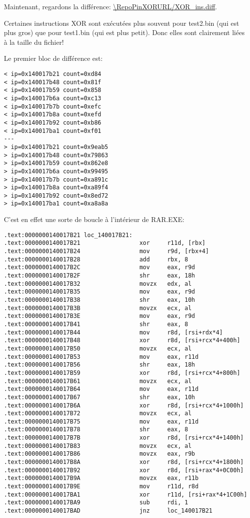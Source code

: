 Maintenant, regardons la différence: \url{\RepoPinXORURL/XOR_ins.diff}.

Certaines instructions XOR sont exécutées plus souvent pour test2.bin (qui est plus
gros) que pour test1.bin (qui est plus petit).
Donc elles sont clairement liées à la taille du fichier!

Le premier bloc de différence est:

\begin{lstlisting}
< ip=0x140017b21 count=0xd84
< ip=0x140017b48 count=0x81f
< ip=0x140017b59 count=0x858
< ip=0x140017b6a count=0xc13
< ip=0x140017b7b count=0xefc
< ip=0x140017b8a count=0xefd
< ip=0x140017b92 count=0xb86
< ip=0x140017ba1 count=0xf01
---
> ip=0x140017b21 count=0x9eab5
> ip=0x140017b48 count=0x79863
> ip=0x140017b59 count=0x862e8
> ip=0x140017b6a count=0x99495
> ip=0x140017b7b count=0xa891c
> ip=0x140017b8a count=0xa89f4
> ip=0x140017b92 count=0x8ed72
> ip=0x140017ba1 count=0xa8a8a
\end{lstlisting}

C'est en effet une sorte de boucle à l'intérieur de RAR.EXE:

\begin{lstlisting}
.text:0000000140017B21 loc_140017B21:
.text:0000000140017B21                 xor     r11d, [rbx]
.text:0000000140017B24                 mov     r9d, [rbx+4]
.text:0000000140017B28                 add     rbx, 8
.text:0000000140017B2C                 mov     eax, r9d
.text:0000000140017B2F                 shr     eax, 18h
.text:0000000140017B32                 movzx   edx, al
.text:0000000140017B35                 mov     eax, r9d
.text:0000000140017B38                 shr     eax, 10h
.text:0000000140017B3B                 movzx   ecx, al
.text:0000000140017B3E                 mov     eax, r9d
.text:0000000140017B41                 shr     eax, 8
.text:0000000140017B44                 mov     r8d, [rsi+rdx*4]
.text:0000000140017B48                 xor     r8d, [rsi+rcx*4+400h]
.text:0000000140017B50                 movzx   ecx, al
.text:0000000140017B53                 mov     eax, r11d
.text:0000000140017B56                 shr     eax, 18h
.text:0000000140017B59                 xor     r8d, [rsi+rcx*4+800h]
.text:0000000140017B61                 movzx   ecx, al
.text:0000000140017B64                 mov     eax, r11d
.text:0000000140017B67                 shr     eax, 10h
.text:0000000140017B6A                 xor     r8d, [rsi+rcx*4+1000h]
.text:0000000140017B72                 movzx   ecx, al
.text:0000000140017B75                 mov     eax, r11d
.text:0000000140017B78                 shr     eax, 8
.text:0000000140017B7B                 xor     r8d, [rsi+rcx*4+1400h]
.text:0000000140017B83                 movzx   ecx, al
.text:0000000140017B86                 movzx   eax, r9b
.text:0000000140017B8A                 xor     r8d, [rsi+rcx*4+1800h]
.text:0000000140017B92                 xor     r8d, [rsi+rax*4+0C00h]
.text:0000000140017B9A                 movzx   eax, r11b
.text:0000000140017B9E                 mov     r11d, r8d
.text:0000000140017BA1                 xor     r11d, [rsi+rax*4+1C00h]
.text:0000000140017BA9                 sub     rdi, 1
.text:0000000140017BAD                 jnz     loc_140017B21
\end{lstlisting}

